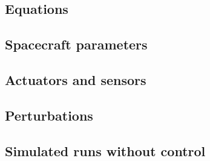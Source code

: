 \subsection{Equations}

\subsection{Spacecraft parameters}

\subsection{Actuators and sensors}

\subsection{Perturbations}

\subsection{Simulated runs without control}

